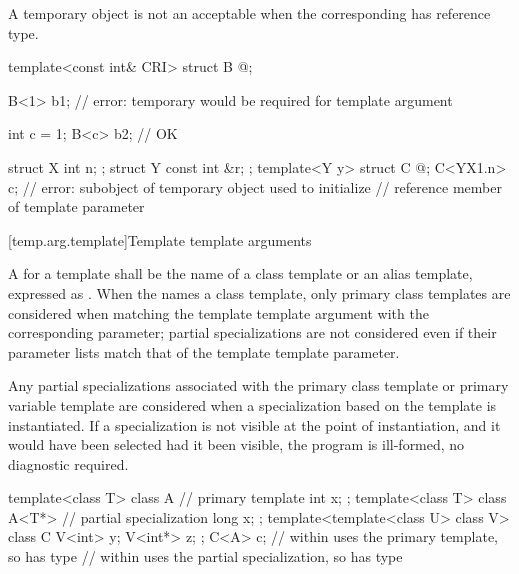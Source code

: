 \pnum
\begin{note}
A temporary object
is not an acceptable
when the corresponding
has reference type.
\begin{example}
\begin{codeblock}
template<const int& CRI> struct B { @\commentellip@ };

B<1> b1;                        // error: temporary would be required for template argument

int c = 1;
B<c> b2;                        // OK

struct X { int n; };
struct Y { const int &r; };
template<Y y> struct C { @\commentellip@ };
C<Y{X{1}.n}> c;                 // error: subobject of temporary object used to initialize
                                // reference member of template parameter
\end{codeblock}
\end{example}
\end{note}

[temp.arg.template]{Template template arguments}

\pnum
A
for a template
shall be the name of a class template or an alias template, expressed as
.
When the  names a class
template, only primary class templates are considered when matching the template template
argument with the corresponding parameter; partial specializations are not
considered even if their parameter lists match that of the template template
parameter.

\pnum
Any partial specializations associated with the
primary class template or primary variable template are considered when a
specialization based on the template
is instantiated.
If a specialization is not visible at the point of instantiation,
and it would have been selected had it been visible, the program is ill-formed,
no diagnostic required.
\begin{example}
\begin{codeblock}
template<class T> class A {     // primary template
  int x;
};
template<class T> class A<T*> { // partial specialization
  long x;
};
template<template<class U> class V> class C {
  V<int>  y;
  V<int*> z;
};
C<A> c;             //  within  uses the primary template, so  has type 
                    //  within  uses the partial specialization, so  has type 
\end{codeblock}
\end{example}


